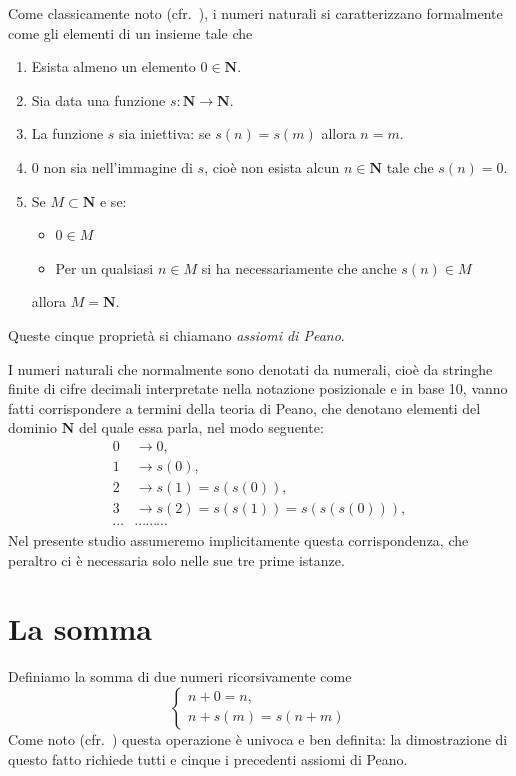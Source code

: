 \documentclass[a4paper,14pt]{report}
\begin{document}
Come classicamente noto (cfr.\ \cite{peano}), i numeri naturali si caratterizzano formalmente come gli elementi di un insieme tale che
\begin{enumerate}
    \item Esista almeno un elemento $0\in{\mathbf N}$.
    \item Sia data una funzione $s\colon{\mathbf N}\to{\mathbf N}$.
    \item La funzione $s$ sia iniettiva: se $s(n)=s(m)$ allora $n=m$.
    \item $0$ non sia nell'immagine di $s$, cioè non esista alcun $n\in{\mathbf N}$ tale che $s(n)=0$.
    \item Se $M\subset{\mathbf N}$ e se:
    \begin{itemize}
        \item $0\in M$
        \item Per un qualsiasi $n\in M$ si ha necessariamente che anche $s(n)\in M$
    \end{itemize}
    allora $M={\mathbf N}$.
\end{enumerate}
Queste cinque proprietà si chiamano {\em assiomi di Peano}.

I numeri naturali che normalmente sono denotati da numerali, cioè da stringhe finite di cifre decimali interpretate nella notazione posizionale e in base 10, vanno fatti corrispondere a termini della teoria di Peano, che denotano elementi del dominio $\mathbf N$ del quale essa parla, nel modo seguente:
\begin{align*}
    0 &\to 0, \\
    1 &\to s(0), \\
    2 &\to s(1)=s(s(0)), \\
    3 &\to s(2)=s(s(1))=s(s(s(0))), \\
    \cdots & \cdots \cdots \cdots
\end{align*}
Nel presente studio assumeremo implicitamente questa corrispondenza, che peraltro ci è necessaria solo nelle sue tre prime istanze.

\section{La somma}

Definiamo la somma di due numeri ricorsivamente come
\[
\label{eq-dedekind}
\begin{cases}
    n+0 = n, \\
    n+s(m) = s(n+m)
\end{cases}
\]
Come noto (cfr.\ \cite{dedekind}) questa operazione è univoca e ben definita: la dimostrazione di questo fatto richiede tutti e cinque i precedenti assiomi di Peano.
\end{document}
